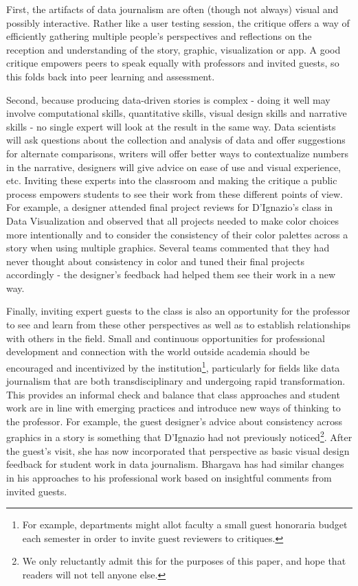 \documentclass{acm_proc_article-sp}
\begin{document}
First, the artifacts of data journalism are often (though not always) visual and possibly interactive. Rather like a user testing session, the critique offers a way of efficiently gathering multiple people's perspectives and reflections on the reception and understanding of the story, graphic, visualization or app. A good critique empowers peers to speak equally with professors and invited guests, so this folds back into peer learning and assessment. 

Second, because producing data-driven stories is complex - doing it well may involve computational skills, quantitative skills, visual design skills and narrative skills - no single expert will look at the result in the same way. Data scientists will ask questions about the collection and analysis of data and offer suggestions for alternate comparisons, writers will offer better ways to contextualize numbers in the narrative, designers will give advice on ease of use and visual experience, etc. Inviting these experts into the classroom and making the critique a public process empowers students to see their work from these different points of view. For example, a designer attended final project reviews for D'Ignazio's class in Data Visualization and observed that all projects needed to make color choices more intentionally and to consider the consistency of their color palettes across a story when using multiple graphics. Several teams commented that they had never thought about consistency in color and tuned their final projects accordingly - the designer's feedback had helped them see their work in a new way.

Finally, inviting expert guests to the class is also an opportunity for the professor to see and learn from these other perspectives as well as to establish relationships with others in the field. Small and continuous opportunities for professional development and connection with the world outside academia should be encouraged and incentivized by the institution\footnote{For example, departments might allot faculty a small guest honoraria budget each semester in order to invite guest reviewers to critiques.}, particularly for fields like data journalism that are both transdisciplinary and undergoing rapid transformation. This provides an informal check and balance that class approaches and student work are in line with emerging practices and introduce new ways of thinking to the professor. For example, the guest designer's advice about consistency across graphics in a story is something that D'Ignazio had not previously noticed\footnote{We only reluctantly admit this for the purposes of this paper, and hope that readers will not tell anyone else.}. After the guest's visit, she has now incorporated that perspective as basic visual design feedback for student work in data journalism.  Bhargava has had similar changes in his approaches to his professional work based on insightful comments from invited guests.
\end{document}
